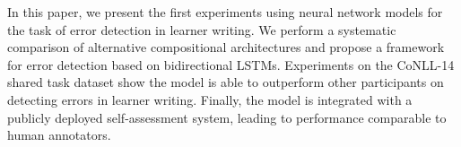 In this paper, we present the first experiments using neural network models for the task of error detection in learner writing. We perform a systematic comparison of alternative compositional architectures and propose a framework for error detection based on bidirectional LSTMs. Experiments on the CoNLL-14 shared task dataset show the model is able to outperform other participants on detecting errors in learner writing. Finally, the model is integrated with a publicly deployed self-assessment system, leading to performance comparable to human annotators.
